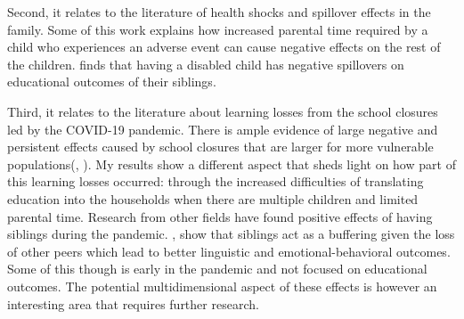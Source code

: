 Second, it relates to the literature of health shocks and spillover effects in the family. Some of this work explains how increased parental time required by a child who experiences an adverse event can cause negative effects on the rest of the children. \cite{black_sibling_2021} finds that having a disabled child has negative spillovers on educational outcomes of their siblings.

Third, it relates to the literature about learning losses from the school closures led by the COVID-19 pandemic. There is ample evidence of large negative and persistent effects caused by school closures that are larger for more vulnerable populations(\cite{haelermans_inequality_2022}, \cite{jakubowski_global_2023}). My results show a different aspect that sheds light on how part of this learning losses occurred: through the increased difficulties of translating education into the households when there are multiple children and limited parental time. Research from other fields have found positive effects of having siblings during the pandemic. \cite{hughes_siblings_2023}, \cite{lampis_long-lasting_2023} show that siblings act as a buffering given the loss of other peers which lead to better linguistic and emotional-behavioral outcomes. Some of this though is early in the pandemic and not focused on educational outcomes. The potential multidimensional aspect of these effects is however an interesting area that requires further research.






